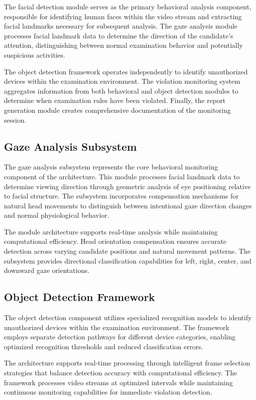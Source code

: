 \documentclass[conference]{IEEEtran}
\begin{document}
The facial detection module serves as the primary behavioral analysis component, responsible 
for identifying human faces within the video stream and extracting facial landmarks necessary 
for subsequent analysis. The gaze analysis module processes facial landmark data to determine 
the direction of the candidate's attention, distinguishing between normal examination behavior 
and potentially suspicious activities.

The object detection framework operates independently to identify unauthorized devices 
within the examination environment. The violation monitoring system aggregates information 
from both behavioral and object detection modules to determine when examination rules have 
been violated. Finally, the report generation module creates comprehensive documentation 
of the monitoring session.

\subsection{Gaze Analysis Subsystem}

The gaze analysis subsystem represents the core behavioral monitoring component of the 
architecture. This module processes facial landmark data to determine viewing direction 
through geometric analysis of eye positioning relative to facial structure. The subsystem 
incorporates compensation mechanisms for natural head movements to distinguish between 
intentional gaze direction changes and normal physiological behavior.

The module architecture supports real-time analysis while maintaining computational efficiency. 
Head orientation compensation ensures accurate detection across varying candidate positions 
and natural movement patterns. The subsystem provides directional classification capabilities 
for left, right, center, and downward gaze orientations.

\subsection{Object Detection Framework}

The object detection component utilizes specialized recognition models to identify unauthorized 
devices within the examination environment. The framework employs separate detection pathways 
for different device categories, enabling optimized recognition thresholds and reduced 
classification errors.

The architecture supports real-time processing through intelligent frame selection strategies 
that balance detection accuracy with computational efficiency. The framework processes video 
streams at optimized intervals while maintaining continuous monitoring capabilities for 
immediate violation detection.
\end{document}
